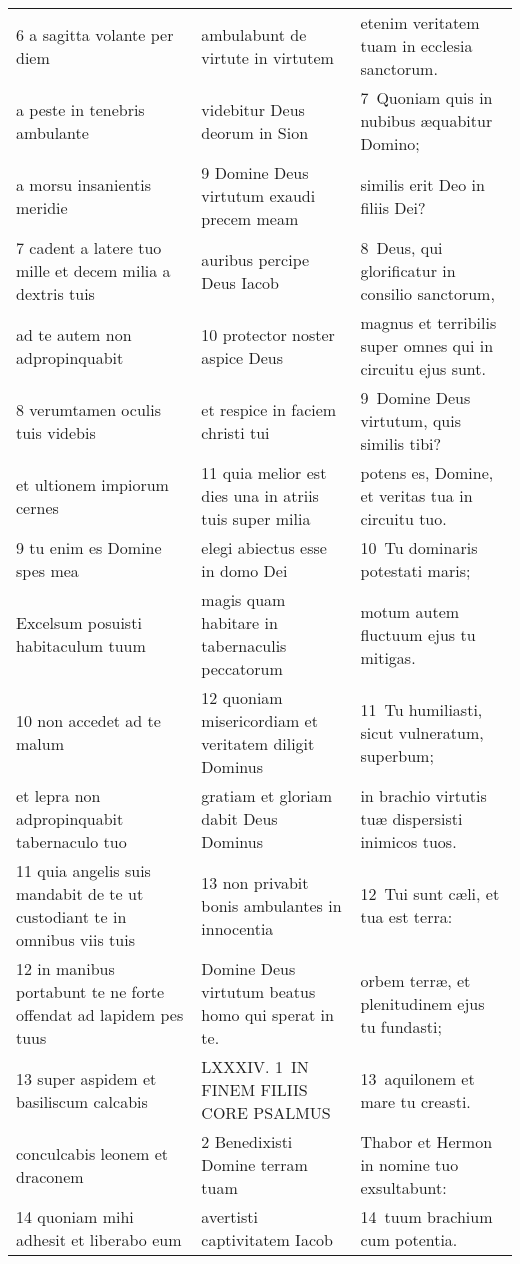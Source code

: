 \documentclass{article}
\begin{document}
\begin{longtable}{@{}p{}p{}p{}@{}}
6 a sagitta volante per diem	&	ambulabunt de virtute in virtutem	&	etenim veritatem tuam in ecclesia sanctorum.	\\
a peste in tenebris ambulante	&	videbitur Deus deorum in Sion	&	7 Quoniam quis in nubibus æquabitur Domino;	\\
a morsu insanientis meridie	&	9 Domine Deus virtutum exaudi precem meam	&	similis erit Deo in filiis Dei?	\\
7 cadent a latere tuo mille et decem milia a dextris tuis	&	auribus percipe Deus Iacob	&	8 Deus, qui glorificatur in consilio sanctorum,	\\
ad te autem non adpropinquabit	&	10 protector noster aspice Deus	&	magnus et terribilis super omnes qui in circuitu ejus sunt.	\\
8 verumtamen oculis tuis videbis	&	et respice in faciem christi tui	&	9 Domine Deus virtutum, quis similis tibi?	\\
et ultionem impiorum cernes	&	11 quia melior est dies una in atriis tuis super milia	&	potens es, Domine, et veritas tua in circuitu tuo.	\\
9 tu enim es Domine spes mea	&	elegi abiectus esse in domo Dei	&	10 Tu dominaris potestati maris;	\\
Excelsum posuisti habitaculum tuum	&	magis quam habitare in tabernaculis peccatorum	&	motum autem fluctuum ejus tu mitigas.	\\
10 non accedet ad te malum	&	12 quoniam misericordiam et veritatem diligit Dominus	&	11 Tu humiliasti, sicut vulneratum, superbum;	\\
et lepra non adpropinquabit tabernaculo tuo	&	gratiam et gloriam dabit Deus Dominus	&	in brachio virtutis tuæ dispersisti inimicos tuos.	\\
11 quia angelis suis mandabit de te ut custodiant te in omnibus viis tuis	&	13 non privabit bonis ambulantes in innocentia	&	12 Tui sunt cæli, et tua est terra:	\\
12 in manibus portabunt te ne forte offendat ad lapidem pes tuus	&	Domine Deus virtutum beatus homo qui sperat in te.	&	orbem terræ, et plenitudinem ejus tu fundasti;	\\
13 super aspidem et basiliscum calcabis	&	LXXXIV. 1 IN FINEM FILIIS CORE PSALMUS	&	13 aquilonem et mare tu creasti.	\\
conculcabis leonem et draconem	&	2 Benedixisti Domine terram tuam	&	Thabor et Hermon in nomine tuo exsultabunt:	\\
14 quoniam mihi adhesit et liberabo eum	&	avertisti captivitatem Iacob	&	14 tuum brachium cum potentia.	\\

\end{longtable}
\end{document}
